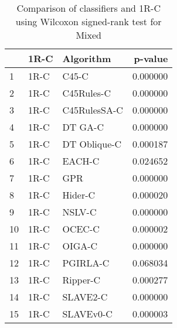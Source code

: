 \begin{table}
\footnotesize
\caption{Comparison of classifiers and 1R-C using Wilcoxon signed-rank test for Mixed}
\label{tab:1R-C wilcoxon Mixed comparison}
\begin{tabular}{lllr}
\hline
 & 1R-C & Algorithm & p-value \\
\hline
1 & 1R-C & C45-C & 0.000000 \\
2 & 1R-C & C45Rules-C & 0.000000 \\
3 & 1R-C & C45RulesSA-C & 0.000000 \\
4 & 1R-C & DT GA-C & 0.000000 \\
5 & 1R-C & DT Oblique-C & 0.000187 \\
6 & 1R-C & EACH-C & 0.024652 \\
7 & 1R-C & GPR & 0.000000 \\
8 & 1R-C & Hider-C & 0.000020 \\
9 & 1R-C & NSLV-C & 0.000000 \\
10 & 1R-C & OCEC-C & 0.000002 \\
11 & 1R-C & OIGA-C & 0.000000 \\
12 & 1R-C & PGIRLA-C & 0.068034 \\
13 & 1R-C & Ripper-C & 0.000277 \\
14 & 1R-C & SLAVE2-C & 0.000000 \\
15 & 1R-C & SLAVEv0-C & 0.000003 \\
\hline
\end{tabular}
\end{table}
